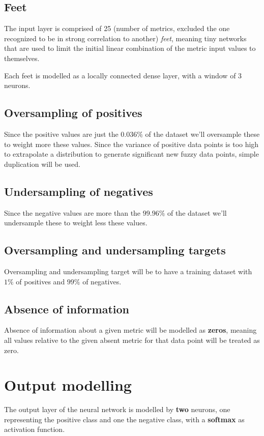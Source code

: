 \section{Feet}
The input layer is comprised of 25 (number of metrics, excluded the one recognized to be in strong correlation to another) \textit{feet}, meaning tiny networks that are used to limit the initial linear combination of the metric input values to themselves.

Each feet is modelled as a locally connected dense layer, with a window of 3 neurons.

\section{Oversampling of positives}
Since the positive values are just the \(0.036\% \) of the dataset we'll oversample these to weight more these values. Since the variance of positive data points is too high to extrapolate a distribution to generate significant new fuzzy data points, simple duplication will be used.

\section{Undersampling of negatives}
Since the negative values are more than the \(99.96\% \) of the dataset we'll undersample these to weight less these values.

\section{Oversampling and undersampling targets}
Oversampling and undersampling target will be to have a training dataset with \(1\% \) of positives and \(99\% \) of negatives.

\section{Absence of information}
Absence of information about a given metric will be modelled as \textbf{zeros}, meaning all values relative to the given absent metric for that data point will be treated as zero.

\chapter{Output modelling}
The output layer of the neural network is modelled by \textbf{two} neurons, one representing the positive class and one the negative class, with a \textbf{softmax} as activation function.

